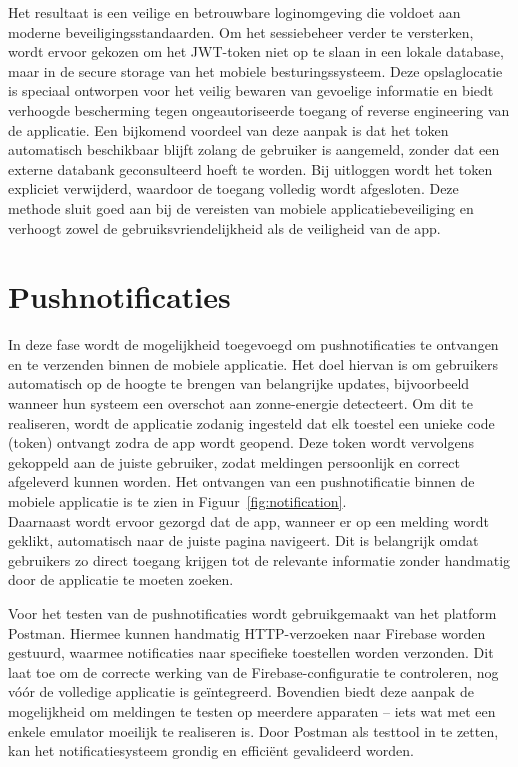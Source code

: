 Het resultaat is een veilige en betrouwbare loginomgeving die voldoet aan moderne beveiligingsstandaarden. Om het sessiebeheer verder te versterken, wordt ervoor gekozen om het JWT-token niet op te slaan in een lokale database, maar in de secure storage van het mobiele besturingssysteem. Deze opslaglocatie is speciaal ontworpen voor het veilig bewaren van gevoelige informatie en biedt verhoogde bescherming tegen ongeautoriseerde toegang of reverse engineering van de applicatie. Een bijkomend voordeel van deze aanpak is dat het token automatisch beschikbaar blijft zolang de gebruiker is aangemeld, zonder dat een externe databank geconsulteerd hoeft te worden. Bij uitloggen wordt het token expliciet verwijderd, waardoor de toegang volledig wordt afgesloten. Deze methode sluit goed aan bij de vereisten van mobiele applicatiebeveiliging en verhoogt zowel de gebruiksvriendelijkheid als de veiligheid van de app.

\section{Pushnotificaties}

In deze fase wordt de mogelijkheid toegevoegd om pushnotificaties te ontvangen en te verzenden binnen de mobiele applicatie. Het doel hiervan is om gebruikers automatisch op de hoogte te brengen van belangrijke updates, bijvoorbeeld wanneer hun systeem een overschot aan zonne-energie detecteert. Om dit te realiseren, wordt de applicatie zodanig ingesteld dat elk toestel een unieke code (token) ontvangt zodra de app wordt geopend. Deze token wordt vervolgens gekoppeld aan de juiste gebruiker, zodat meldingen persoonlijk en correct afgeleverd kunnen worden. Het ontvangen van een pushnotificatie binnen de mobiele applicatie is te zien in Figuur~\ref{fig:notification}.\\

Daarnaast wordt ervoor gezorgd dat de app, wanneer er op een melding wordt geklikt, automatisch naar de juiste pagina navigeert. Dit is belangrijk omdat gebruikers zo direct toegang krijgen tot de relevante informatie zonder handmatig door de applicatie te moeten zoeken.

Voor het testen van de pushnotificaties wordt gebruikgemaakt van het platform Postman. Hiermee kunnen handmatig HTTP-verzoeken naar Firebase worden gestuurd, waarmee notificaties naar specifieke toestellen worden verzonden. Dit laat toe om de correcte werking van de Firebase-configuratie te controleren, nog vóór de volledige applicatie is geïntegreerd. Bovendien biedt deze aanpak de mogelijkheid om meldingen te testen op meerdere apparaten – iets wat met een enkele emulator moeilijk te realiseren is. Door Postman als testtool in te zetten, kan het notificatiesysteem grondig en efficiënt gevalideerd worden.

